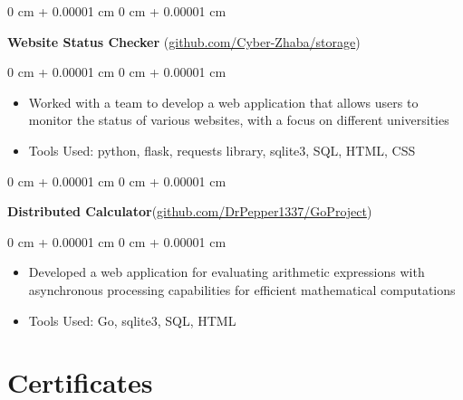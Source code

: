 \documentclass[10pt, letterpaper]{article}
\newenvironment{highlights}{
    \begin{itemize}[
        topsep=0.10 cm,
        parsep=0.10 cm,
        partopsep=0pt,
        itemsep=0pt,
        leftmargin=0 cm + 10pt
    ]
}{
    \end{itemize}
} %
\newenvironment{onecolentry}{
    \begin{adjustwidth}{
        0 cm + 0.00001 cm
    }{
        0 cm + 0.00001 cm
    }
}{
    \end{adjustwidth}
} %
\begin{document}
        \vspace{0.2 cm}

        \begin{onecolentry}
            \textbf{Website Status Checker} (\href{https://github.com/Cyber-Zhaba/storage}{github.com/Cyber-Zhaba/storage})\end{onecolentry}

        \vspace{0.10 cm}
        \begin{onecolentry}
            \begin{highlights}
                \item Worked with a team to develop a web application that allows users to monitor the status of various websites, with a focus on different universities
                \item Tools Used: python, flask, requests library, sqlite3, SQL, HTML, CSS
            \end{highlights}
        \end{onecolentry}

        \vspace{0.2 cm}

        \begin{onecolentry}
            \textbf{Distributed Calculator}(\href{https://github.com/DrPepper1337/GoProject}{github.com/DrPepper1337/GoProject})\end{onecolentry}

        \vspace{0.10 cm}
        \begin{onecolentry}
            \begin{highlights}
                \item Developed a web application for evaluating arithmetic expressions with asynchronous processing capabilities for efficient mathematical computations
                \item Tools Used: Go, sqlite3, SQL, HTML
            \end{highlights}
        \end{onecolentry}

     \section{Certificates}
    
\end{document}
